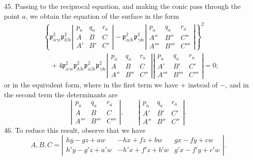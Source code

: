 \documentclass[11pt,a4paper]{article}
\newcommand{\p}{\mathfrak p}
\begin{document}
45. Passing to the reciprocal equation, and making the conic pass through the point
$a$, we obtain the equation of the surface in the form
\[
\begin{aligned}
&\left\{\p^2_{\alpha\gamma\epsilon}\p^2_{\delta\beta\epsilon}
\left|\begin{array}{ccc}
p_a&q_a&r_a\\ A&B&C\\ A'&B'&C'
\end{array}\right|
-\p^2_{\alpha\beta\epsilon}\p^2_{\gamma\delta\epsilon}
\left|\begin{array}{ccc}
p_a&q_a&r_a\\ A''&B''&C''\\ A'''&B'''&C'''
\end{array}\right|\right\}^2\\
&\quad+4\p^2_{\alpha\gamma\epsilon}\p^2_{\delta\beta\epsilon}
\p^2_{\alpha\beta\epsilon}\p^2_{\gamma\delta\epsilon}
\left|\begin{array}{ccc}
p_a&q_a&r_a\\ A&B&C\\ A''&B''&C''
\end{array}\right|
\left|\begin{array}{ccc}
p_a&q_a&r_a\\ A'&B'&C'\\ A'''&B'''&C'''
\end{array}\right|=0;
\end{aligned}
\]
or in the equivalent form, where in the first term we have $+$ instead of $-$, and
in the second term the determinants are
\[
\left|\begin{array}{ccc}
p_a&q_a&r_a\\ A&B&C\\ A'''&B'''&C'''
\end{array}\right|,
\qquad
\left|\begin{array}{ccc}
p_a&q_a&r_a\\ A'&B'&C'\\ A''&B''&C''
\end{array}\right|.
\]
46. To reduce this result, observe that we have
\[
A,B,C=
\left|\begin{array}{ccc}
hy-gz+aw&-hx+fz+bw&gx-fy+cw\\
h'y-g'z+a'w&-h'x+f'z+b'w&g'x-f'y+c'w
\end{array}\right|.
\]
\end{document}
